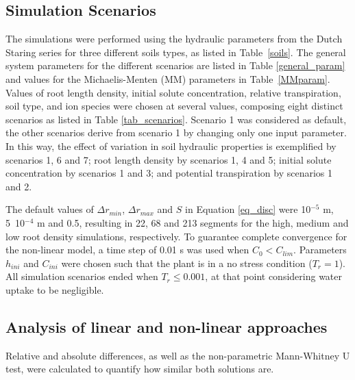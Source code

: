 \subsection*{Simulation Scenarios}

The simulations were performed using the hydraulic parameters from the Dutch Staring series \cite{wosten} for three different soils types, as listed in Table~\ref{soils}. 
The general system parameters for the different scenarios are listed in Table \ref{general_param} and values for the Michaelis-Menten (MM) parameters in Table~\ref{MMparam}. 
Values of root length density, initial solute concentration, relative transpiration, soil type, and ion species were chosen at several values, composing eight distinct scenarios as listed in Table \ref{tab_scenarios}. 
Scenario 1 was considered as default, the other scenarios derive from scenario 1 by changing only one input parameter. 
In this way, the effect of variation in soil hydraulic properties is exemplified by scenarios 1, 6 and 7; root length density by scenarios 1, 4 and 5; initial solute concentration by scenarios 1 and 3; and potential transpiration by scenarios 1 and 2.

%







The default values of $\Delta r_{min}$, $\Delta r_{max}$ and $S$ in Equation \ref{eq_disc} were 10$^{-5}$ m, 5~10$^{-4}$ m and 0.5, resulting in 22, 68 and 213 segments for the high, medium and low root density simulations, respectively.
To guarantee complete convergence for the non-linear model, a time step of 0.01 s was used when $C_0 < C_{lim}$.
Parameters $h_{ini}$ and $C_{ini}$ were chosen such that the plant is in a no stress condition ($T_r=1$).
All simulation scenarios ended when $T_r \leq 0.001$, at that point considering water uptake to be negligible.

\subsection*{Analysis of linear and non-linear approaches}

Relative and absolute differences, as well as the non-parametric Mann-Whitney U test, were calculated to quantify how similar both solutions are.

